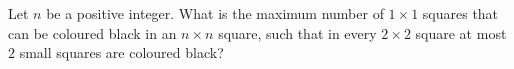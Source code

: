 Let $n$ be a positive integer. What is the maximum number of $1\times 1$ squares that can be
coloured black in an $n\times n$ square, such that in every $2\times 2$ square
at most $2$ small squares are coloured black?